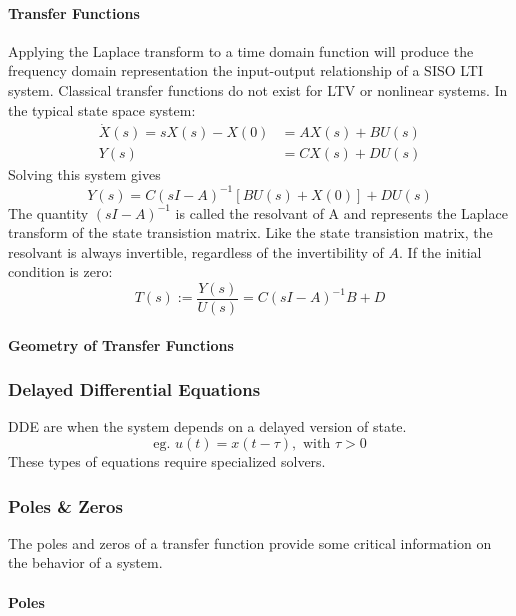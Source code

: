 \documentclass[../notes.tex]{subfiles}
\begin{document}
\paragraph{Transfer Functions}
Applying the Laplace transform to a time domain function will produce the frequency domain representation the input-output relationship of a SISO LTI system. Classical transfer functions do not exist for LTV or nonlinear systems. In the typical state space system:
\begin{align*}
    \dot{X}(s) = sX(s) - X(0) &= AX(s) + BU(s) \\
    Y(s) &= CX(s) + DU(s)
\end{align*}
Solving this system gives 
\begin{equation}
    Y(s) = C(sI-A)^{-1}[BU(s) + X(0)] + DU(s)
\end{equation}
The quantity $(sI-A)^{-1}$ is called the resolvant of A and represents the Laplace transform of the state transistion matrix. Like the state transistion matrix, the resolvant is always invertible, regardless of the invertibility of $A$. If the initial condition is zero:
\begin{equation}
    T(s) := \frac{Y(s)}{U(s)} = C(sI-A)^{-1}B+D
\end{equation}

\paragraph{Geometry of Transfer Functions}

\subsubsection{Delayed Differential Equations}
DDE are when the system depends on a delayed version of state.
\begin{equation}
    \text{eg. }u(t) = x(t-\tau), \text{ with } \tau > 0
\end{equation}
These types of equations require specialized solvers.

\subsubsection{Poles \& Zeros}
The poles and zeros of a transfer function provide some critical information on the behavior of a system.

\paragraph{Poles}
\end{document}
